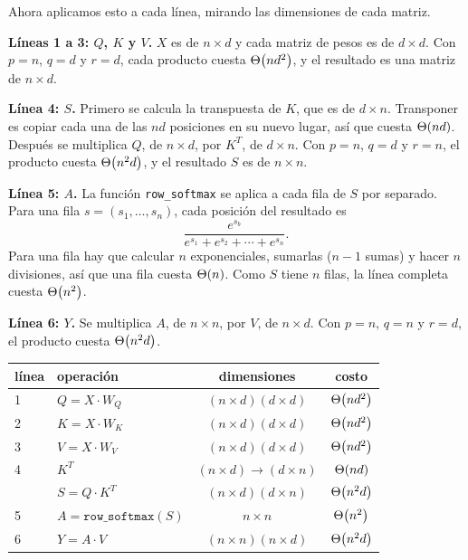 Ahora aplicamos esto a cada línea, mirando las dimensiones de cada matriz.

\textbf{Líneas 1 a 3: $Q$, $K$ y $V$.} $X$ es de $n \times d$ y cada matriz de pesos es
de $d \times d$. Con $p = n$, $q = d$ y $r = d$, cada producto cuesta $\Theta\!\left(n d^2\right)$, y el
resultado es una matriz de $n \times d$.

\textbf{Línea 4: $S$.} Primero se calcula la transpuesta de $K$, que es de $d \times n$.
Transponer es copiar cada una de las $n d$ posiciones en su nuevo lugar, así que cuesta
$\Theta\!\left(n d\right)$. Después se multiplica $Q$, de $n \times d$, por $K^T$, de $d \times n$. Con
$p = n$, $q = d$ y $r = n$, el producto cuesta $\Theta\!\left(n^2 d\right)$, y el resultado $S$ es de
$n \times n$.

\textbf{Línea 5: $A$.} La función \texttt{row\_softmax} se aplica a cada fila de $S$ por
separado. Para una fila $s = (s_1, \dots, s_n)$, cada posición del resultado es
\[
  \frac{e^{s_b}}{e^{s_1} + e^{s_2} + \cdots + e^{s_n}}.
\]
Para una fila hay que calcular $n$ exponenciales, sumarlas ($n - 1$ sumas) y hacer $n$
divisiones, así que una fila cuesta $\Theta\!\left(n\right)$. Como $S$ tiene $n$ filas, la línea completa
cuesta $\Theta\!\left(n^2\right)$.

\textbf{Línea 6: $Y$.} Se multiplica $A$, de $n \times n$, por $V$, de $n \times d$. Con
$p = n$, $q = n$ y $r = d$, el producto cuesta $\Theta\!\left(n^2 d\right)$.

\begin{center}
\begin{tabular}{llcc}
  \toprule
  línea & operación & dimensiones & costo \\
  \midrule
  1 & $Q = X \cdot W_Q$ & $(n \times d)(d \times d)$ & $\Theta\!\left(n d^2\right)$ \\
  2 & $K = X \cdot W_K$ & $(n \times d)(d \times d)$ & $\Theta\!\left(n d^2\right)$ \\
  3 & $V = X \cdot W_V$ & $(n \times d)(d \times d)$ & $\Theta\!\left(n d^2\right)$ \\
  4 & $K^T$             & $(n \times d) \to (d \times n)$ & $\Theta\!\left(n d\right)$ \\
    & $S = Q \cdot K^T$ & $(n \times d)(d \times n)$ & $\Theta\!\left(n^2 d\right)$ \\
  5 & $A = \texttt{row\_softmax}(S)$ & $n \times n$ & $\Theta\!\left(n^2\right)$ \\
  6 & $Y = A \cdot V$   & $(n \times n)(n \times d)$ & $\Theta\!\left(n^2 d\right)$ \\
  \bottomrule
\end{tabular}
\end{center}

